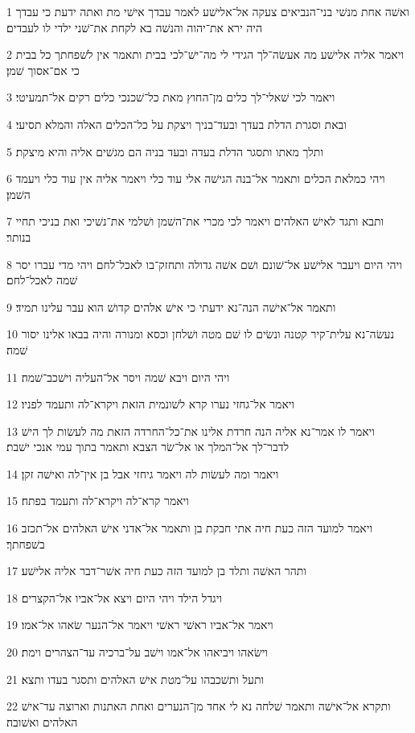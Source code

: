 \par 1 ואשׁה אחת מנשׁי בני־הנביאים צעקה אל־אלישׁע לאמר עבדך אישׁי מת ואתה ידעת כי עבדך היה ירא את־יהוה והנשׁה בא לקחת את־שׁני ילדי לו לעבדים׃
\par 2 ויאמר אליה אלישׁע מה אעשׂה־לך הגידי לי מה־ישׁ־לכי בבית ותאמר אין לשׁפחתך כל בבית כי אם־אסוך שׁמן׃
\par 3 ויאמר לכי שׁאלי־לך כלים מן־החוץ מאת כל־שׁכנכי כלים רקים אל־תמעיטי׃
\par 4 ובאת וסגרת הדלת בעדך ובעד־בניך ויצקת על כל־הכלים האלה והמלא תסיעי׃
\par 5 ותלך מאתו ותסגר הדלת בעדה ובעד בניה הם מגשׁים אליה והיא מיצקת׃
\par 6 ויהי כמלאת הכלים ותאמר אל־בנה הגישׁה אלי עוד כלי ויאמר אליה אין עוד כלי ויעמד השׁמן׃
\par 7 ותבא ותגד לאישׁ האלהים ויאמר לכי מכרי את־השׁמן ושׁלמי את־נשׁיכי ואת בניכי תחיי בנותר׃
\par 8 ויהי היום ויעבר אלישׁע אל־שׁונם ושׁם אשׁה גדולה ותחזק־בו לאכל־לחם ויהי מדי עברו יסר שׁמה לאכל־לחם׃
\par 9 ותאמר אל־אישׁה הנה־נא ידעתי כי אישׁ אלהים קדושׁ הוא עבר עלינו תמיד׃
\par 10 נעשׂה־נא עלית־קיר קטנה ונשׂים לו שׁם מטה ושׁלחן וכסא ומנורה והיה בבאו אלינו יסור שׁמה׃
\par 11 ויהי היום ויבא שׁמה ויסר אל־העליה וישׁכב־שׁמה׃
\par 12 ויאמר אל־גחזי נערו קרא לשׁונמית הזאת ויקרא־לה ותעמד לפניו׃
\par 13 ויאמר לו אמר־נא אליה הנה חרדת אלינו את־כל־החרדה הזאת מה לעשׂות לך הישׁ לדבר־לך אל־המלך או אל־שׂר הצבא ותאמר בתוך עמי אנכי ישׁבת׃
\par 14 ויאמר ומה לעשׂות לה ויאמר גיחזי אבל בן אין־לה ואישׁה זקן׃
\par 15 ויאמר קרא־לה ויקרא־לה ותעמד בפתח׃
\par 16 ויאמר למועד הזה כעת חיה אתי חבקת בן ותאמר אל־אדני אישׁ האלהים אל־תכזב בשׁפחתך׃
\par 17 ותהר האשׁה ותלד בן למועד הזה כעת חיה אשׁר־דבר אליה אלישׁע׃
\par 18 ויגדל הילד ויהי היום ויצא אל־אביו אל־הקצרים׃
\par 19 ויאמר אל־אביו ראשׁי ראשׁי ויאמר אל־הנער שׂאהו אל־אמו׃
\par 20 וישׂאהו ויביאהו אל־אמו וישׁב על־ברכיה עד־הצהרים וימת׃
\par 21 ותעל ותשׁכבהו על־מטת אישׁ האלהים ותסגר בעדו ותצא׃
\par 22 ותקרא אל־אישׁה ותאמר שׁלחה נא לי אחד מן־הנערים ואחת האתנות וארוצה עד־אישׁ האלהים ואשׁובה׃
